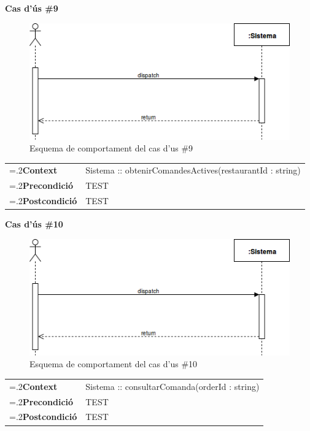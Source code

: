 \clearpage
\noindent\textbf{\large Cas d'ús \#9}\\
\begin{figure}[H]
\centering
\includegraphics[scale=0.6]{Figures/casdus_00.png}
\caption{Esquema de comportament del cas d'us \#9}
\end{figure}
\begin{table}[h]
\noindent
\begin{tabularx}{\linewidth}{
>{\hsize=.2\hsize}X%
>{\hsize=0.8\hsize}X%
}
\textbf{Context} 		& Sistema :: obtenirComandesActives(restaurantId : string) \\
\textbf{Precondició} 	& TEST \\
\textbf{Postcondició}	& TEST \\
\end{tabularx}
\label{}
\end{table}

\noindent\textbf{\large Cas d'ús \#10}\\
\begin{figure}[H]
\centering
\includegraphics[scale=0.6]{Figures/casdus_00.png}
\caption{Esquema de comportament del cas d'us \#10}
\end{figure}
\begin{table}[h]
\noindent
\begin{tabularx}{\linewidth}{
>{\hsize=.2\hsize}X%
>{\hsize=0.8\hsize}X%
}
\textbf{Context} 		& Sistema :: consultarComanda(orderId : string) \\
\textbf{Precondició} 	& TEST \\
\textbf{Postcondició}	& TEST \\
\end{tabularx}
\label{}
\end{table}

